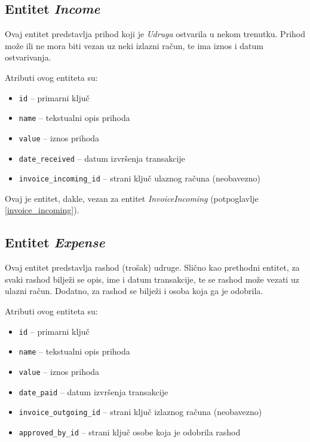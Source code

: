 \documentclass[times, utf8, diplomski]{fer}
\begin{document}
\subsection{Entitet \emph{Income}} \label{income}

Ovaj entitet predstavlja prihod koji je \emph{Udruga} ostvarila u nekom
trenutku. Prihod može ili ne mora biti vezan uz neki izlazni račun, te ima iznos
i datum ostvarivanja.

\medskip
Atributi ovog entiteta su:
\begin{itemize}
    \item \texttt{id} -- primarni ključ
    \item \texttt{name} -- tekstualni opis prihoda
    \item \texttt{value} -- iznos prihoda
    \item \texttt{date\_received} -- datum izvršenja transakcije
    \item \texttt{invoice\_incoming\_id} -- strani ključ ulaznog računa
        (neobavezno)
\end{itemize}

Ovaj je entitet, dakle, vezan za entitet \emph{InvoiceIncoming} (potpoglavlje
\ref{invoice_incoming}).

\subsection{Entitet \emph{Expense}} \label{expense}

Ovaj entitet predstavlja rashod (trošak) udruge. Slično kao prethodni entitet,
za svaki rashod bilježi se opis, ime i datum transakcije, te se rashod može
vezati uz ulazni račun. Dodatno, za rashod se bilježi i osoba koja ga je
odobrila.

\medskip
Atributi ovog entiteta su:
\begin{itemize}
    \item \texttt{id} -- primarni ključ
    \item \texttt{name} -- tekstualni opis prihoda
    \item \texttt{value} -- iznos prihoda
    \item \texttt{date\_paid} -- datum izvršenja transakcije
    \item \texttt{invoice\_outgoing\_id} -- strani ključ izlaznog računa
        (neobavezno)
    \item \texttt{approved\_by\_id} -- strani ključ osobe koja je odobrila
        rashod
\end{itemize}
\end{document}

